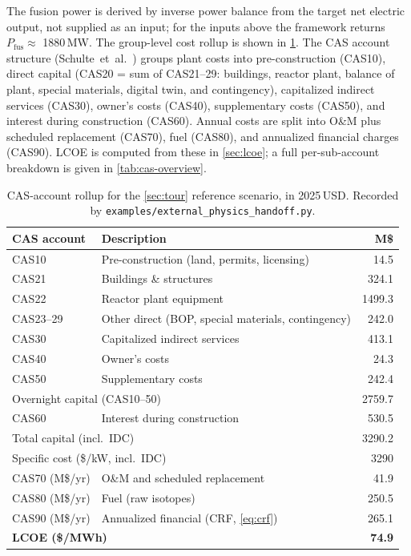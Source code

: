 \documentclass{article}
\begin{document}
The fusion power is derived by inverse power balance from the
target net electric output, not supplied as an input; for the inputs
above the framework returns $P_{\text{fus}} \approx$ 1880\,MW. The
group-level cost rollup is shown in \cref{tab:tour-rollup}. The CAS
account structure (Schulte~et~al.\ \citep{schulte1978}) groups plant
costs into pre-construction (CAS10), direct capital (CAS20 = sum of
CAS21--29: buildings, reactor plant, balance of plant, special
materials, digital twin, and contingency), capitalized indirect
services (CAS30), owner's costs (CAS40), supplementary costs (CAS50),
and interest during construction (CAS60). Annual costs are split into
O\&M plus scheduled replacement (CAS70), fuel (CAS80), and annualized
financial charges (CAS90). LCOE is computed from these in
\cref{sec:lcoe}; a full per-sub-account breakdown is given in
\cref{tab:cas-overview}.

\begin{table}[htbp]
\caption{CAS-account rollup for the \cref{sec:tour} reference
scenario, in 2025\,USD. Recorded by
\texttt{examples/external\_physics\_handoff.py}.}
\label{tab:tour-rollup}
\centering
\begin{tabular}{llr}
\toprule
CAS account & Description & M\$ \\
\midrule
CAS10        & Pre-construction (land, permits, licensing)  & 14.5 \\
CAS21        & Buildings \& structures                      & 324.1 \\
CAS22        & Reactor plant equipment                      & 1499.3 \\
CAS23--29    & Other direct (BOP, special materials, contingency) & 242.0 \\
CAS30        & Capitalized indirect services                & 413.1 \\
CAS40        & Owner's costs                                & 24.3 \\
CAS50        & Supplementary costs                          & 242.4 \\
\midrule
\multicolumn{2}{l}{Overnight capital (CAS10--50)}            & 2759.7 \\
\midrule
CAS60        & Interest during construction                 & 530.5 \\
\multicolumn{2}{l}{Total capital (incl.\ IDC)}               & 3290.2 \\
\multicolumn{2}{l}{Specific cost (\$/kW, incl.\ IDC)}        & 3290 \\
\midrule
CAS70 (M\$/yr) & O\&M and scheduled replacement             & 41.9 \\
CAS80 (M\$/yr) & Fuel (raw isotopes)                        & 250.5 \\
CAS90 (M\$/yr) & Annualized financial (CRF, \cref{eq:crf})   & 265.1 \\
\midrule
\multicolumn{2}{l}{\textbf{LCOE (\$/MWh)}}                  & \textbf{74.9} \\
\bottomrule
\end{tabular}
\end{table}
\end{document}
